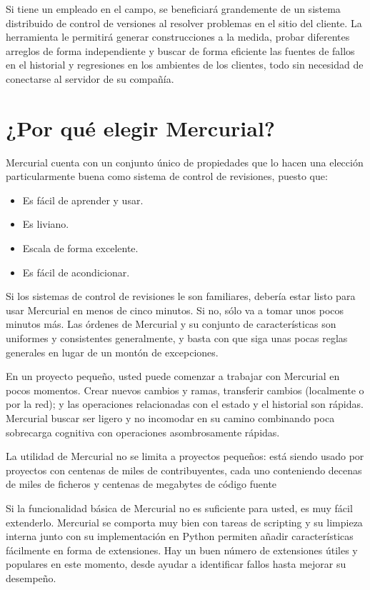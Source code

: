 Si tiene un empleado en el campo, se beneficiará grandemente de un
sistema distribuido de control de versiones al resolver problemas en
el sitio del cliente. La herramienta le permitirá generar
construcciones a la medida, probar diferentes arreglos de forma
independiente y buscar de forma eficiente las fuentes de fallos en el
historial y regresiones en los ambientes de los clientes, todo sin
necesidad de conectarse al servidor de su compañía.

\section{¿Por qué elegir Mercurial?}

Mercurial cuenta con un conjunto único de propiedades que lo hacen
una elección particularmente buena como sistema de control de
revisiones, puesto que:
\begin{itemize}
\item Es fácil de aprender y usar.
\item Es liviano.
\item Escala de forma excelente.
\item Es fácil de acondicionar.
\end{itemize}

Si los sistemas de control de revisiones le son familiares, debería
estar listo para usar Mercurial en menos de cinco minutos. Si no, sólo va a
tomar unos pocos minutos más. Las órdenes de Mercurial y su conjunto
de características son uniformes y consistentes generalmente, y basta
con que siga unas pocas reglas generales en lugar de un montón de
excepciones.

En un proyecto pequeño, usted puede comenzar a trabajar con Mercurial en
pocos momentos. Crear nuevos cambios y ramas, transferir cambios (localmente
o por la red); y las operaciones relacionadas con el estado y el
historial son rápidas. Mercurial buscar ser ligero y no incomodar en su
camino combinando poca sobrecarga cognitiva con operaciones
asombrosamente rápidas.

La utilidad de Mercurial no se limita a proyectos pequeños: está
siendo usado por proyectos con centenas de miles de contribuyentes,
cada uno conteniendo decenas de miles de ficheros y centenas de
megabytes de código fuente

Si la funcionalidad básica de Mercurial no es suficiente para usted,
es muy fácil extenderlo. Mercurial se comporta muy bien con tareas de
scripting y su limpieza interna junto con su implementación en Python
permiten añadir características fácilmente en forma de extensiones.
Hay un buen número de extensiones útiles y populares en este momento,
desde ayudar a identificar fallos hasta mejorar su desempeño.

